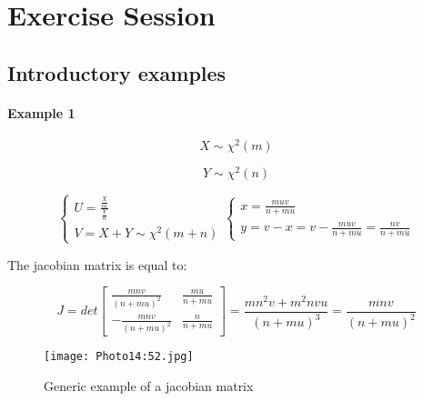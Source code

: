 \setcounter{chapter}{2}
\setchapterabstract{}
\chapter{Exercise Session}
\vspace{-1.5cm}

{\chaptoc\noindent\begin{minipage}[inner sep=0,outer sep=0]{0.9\linewidth}\section{Introductory examples}\end{minipage}}

\subsubsection{Example 1}

\[
X \sim \chi^2 (m)
\]

\[
Y \sim \chi^2 (n)
\]

\begin{equation}
\begin{cases}
    U = \frac{\frac{X}{m}}{\frac{Y}{n}} \\
    V = X+ Y \sim \chi^2 (m+n)
\end{cases} \begin{cases}
    x = \frac{muv}{n+mu} \\
    y = v-x = v - \frac{muv}{n+mu} = \frac{nv}{n+mu}
\end{cases}
\end{equation}

The jacobian matrix is equal to:

\[
J = det \begin{bmatrix}
    \frac{mnv}{(n+mu)^2} & \frac{mu}{n+mu} \\
    -\frac{mnv}{(n+mu)^2} & \frac{n}{n+mu} 
\end{bmatrix} = \frac{mn^2v + m^2nvu}{(n+mu)^3} = \frac{mnv}{(n+mu)^2}
\]



\begin{figure}[h]
    \centering
    \texttt{[image: Photo14:52.jpg]}
    \caption{Generic example of a jacobian matrix}
    \label{fig:14_52}
\end{figure}

